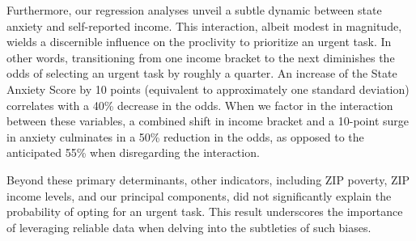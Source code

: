 \documentclass[
]{article}
\begin{document}
Furthermore, our regression analyses unveil a subtle dynamic between
state anxiety and self-reported income. This interaction, albeit modest
in magnitude, wields a discernible influence on the proclivity to
prioritize an urgent task. In other words, transitioning from one income
bracket to the next diminishes the odds of selecting an urgent task by
roughly a quarter. An increase of the State Anxiety Score by 10 points
(equivalent to approximately one standard deviation) correlates with a
40\% decrease in the odds. When we factor in the interaction between
these variables, a combined shift in income bracket and a 10-point surge
in anxiety culminates in a 50\% reduction in the odds, as opposed to the
anticipated 55\% when disregarding the interaction.

Beyond these primary determinants, other indicators, including ZIP
poverty, ZIP income levels, and our principal components, did not
significantly explain the probability of opting for an urgent task. This
result underscores the importance of leveraging reliable data when
delving into the subtleties of such biases.
\end{document}
